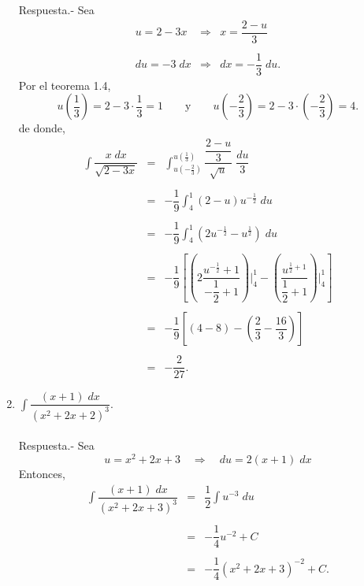 \begin{enumerate}[\bfseries 1.]
	Respuesta.-\; Sea
	$$\begin{array}{rcl}
	    u=2-3x & \Rightarrow & x=\dfrac{2-u}{3}\\\\
	    du=-3\; dx & \Rightarrow & dx=-\dfrac{1}{3}\; du.
	\end{array}$$
	Por el teorema 1.4,
	$$u\left(\dfrac{1}{3}\right)=2-3\cdot \dfrac{1}{3} = 1 \qquad \mbox{y}\qquad u\left(-\dfrac{2}{3}\right)=2-3\cdot \left(-\dfrac{2}{3}\right)=4.$$
	de donde,
	$$\begin{array}{rcl}
	    \displaystyle\int \dfrac{x\; dx}{\sqrt{2-3x}} &=& \displaystyle \int_{u\left(-\frac{2}{3}\right)}^{u\left(\frac{1}{3}\right)} \dfrac{\dfrac{2-u}{3}}{\sqrt{u}}\; \dfrac{du}{3}\\\\
							  &=& -\dfrac{1}{9}\displaystyle \int_{4}^{1} (2-u)u^{-\frac{1}{2}}\; du\\\\
							  &=& -\dfrac{1}{9}\displaystyle \int_{4}^{1} \left(2u^{-\frac{1}{2}}-u^{\frac{1}{2}}\right)\; du\\\\
							  &=&-\dfrac{1}{9}\left[\left(2\dfrac{u^{-\frac{1}{2}}+1}{-\dfrac{1}{2}+1}\right)\bigg|_4^1-\left(\dfrac{u^{\frac{1}{2}+1}}{\dfrac{1}{2}+1}\right)\bigg|_{4}^{1}\right]\\\\
							  &=&-\dfrac{1}{9}\left[(4-8)-\left(\dfrac{2}{3}-\dfrac{16}{3}\right)\right]\\\\
							  &=&-\dfrac{2}{27}.
	\end{array}$$
	\vspace{.5cm}

    \item $\displaystyle\int \dfrac{(x+1)\; dx}{\left(x^2+2x+2\right)^3}.$\\\\

	Respuesta.-\; Sea
	$$u=x^2+2x+3\quad \Rightarrow \quad du=2(x+1)\; dx$$
	Entonces,
	$$\begin{array}{rcl}
	    \displaystyle \int \dfrac{(x+1)\; dx}{\left(x^2+2x+3\right)^3} &=& \displaystyle\dfrac{1}{2}\int u^{-3}\; du\\\\
									   &=&-\dfrac{1}{4}u^{-2}+C\\\\
									   &=&-\dfrac{1}{4}\left(x^2+2x+3\right)^{-2}+C.
	\end{array}$$
	\vspace{.5cm}


\end{enumerate}
